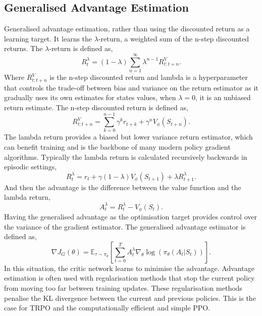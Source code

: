 \subsection{Generalised Advantage Estimation}
Generalised advantage estimation\cite{schulman2015high}, rather than using the discounted return as a learning target. It learns the $\lambda$-return, a weighted sum of the n-step discounted returns. The $\lambda$-return is defined as,
\begin{equation}
	R_t^\lambda = (1-\lambda) \sum_{n=1}^\infty \lambda^{n-1} R_{t:t+n}^V.
\end{equation}
Where $R_{t:t+n}^V$ is the n-step discounted return and lambda is a hyperparameter that controls the trade-off between bias and variance on the return estimator as it gradually uses its own estimates for states values, when $\lambda = 0$, it is an unbiased return estimate. The n-step discounted return is defined as,
\begin{equation}
	R_{t:t+n}^V = \sum_{k=0}^{n-1} \gamma^k r_{t+k} + \gamma^n V_\phi(S_{t+n}).
\end{equation}
The lambda return provides a biased but lower variance return estimator, which can benefit training and is the backbone of many modern policy gradient algorithms. Typically the lambda return is calculated recursively backwards in episodic settings,
\begin{equation}
	R_t^\lambda = r_t + \gamma (1-\lambda) V_\phi(S_{t+1}) + \lambda R_{t+1}^\lambda.
\end{equation}
And then the advantage is the difference between the value function and the lambda return,
\begin{equation}
	A_t^\lambda = R_t^\lambda - V_\phi(S_t).
\end{equation}
Having the generalised advantage as the optimisation target provides control over the variance of the gradient estimator. The generalised advantage estimator is defined as,
\begin{equation}
	\nabla J_G(\theta)  = \mathbb{E}_{\tau \sim \pi_\theta} \left[\sum_{t=0} ^ T A_t^\lambda \nabla_\theta \log(\pi_\theta(A_t|S_t))\right].
\end{equation}
In this situation, the critic network learns to minimise the advantage. Advantage estimation is often used with regularisation methods that stop the current policy from moving too far between training updates. These regularisation methods penalise the KL divergence between the current and previous policies. This is the case for TRPO\cite{shculman2015trust} and the computationally efficient and simple PPO\cite{schulman2017proximal}.

